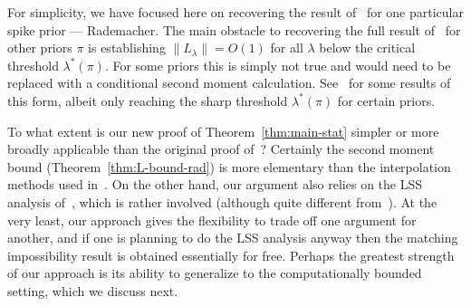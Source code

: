 \documentclass[11pt]{article}
\begin{document}
For simplicity, we have focused here on recovering the result of~\cite{fund-limits-wigner} for one particular spike prior --- Rademacher. The main obstacle to recovering the full result of~\cite{fund-limits-wigner} for other priors $\pi$ is establishing $\|L_\lambda\| = O(1)$ for all $\lambda$ below the critical threshold $\lambda^*(\pi)$. For some priors this is simply not true and would need to be replaced with a conditional second moment calculation. See~\cite{BMVVX,opt-subopt} for some results of this form, albeit only reaching the sharp threshold $\lambda^*(\pi)$ for certain priors.

To what extent is our new proof of Theorem~\ref{thm:main-stat} simpler or more broadly applicable than the original proof of~\cite{fund-limits-wigner}? Certainly the second moment bound (Theorem~\ref{thm:L-bound-rad}) is more elementary than the interpolation methods used in~\cite{fund-limits-wigner}. On the other hand, our argument also relies on the LSS analysis of~\cite{weak-wigner}, which is rather involved (although quite different from~\cite{fund-limits-wigner}). At the very least, our approach gives the flexibility to trade off one argument for another, and if one is planning to do the LSS analysis anyway then the matching impossibility result is obtained essentially for free. Perhaps the greatest strength of our approach is its ability to generalize to the computationally bounded setting, which we discuss next.



\end{document}
